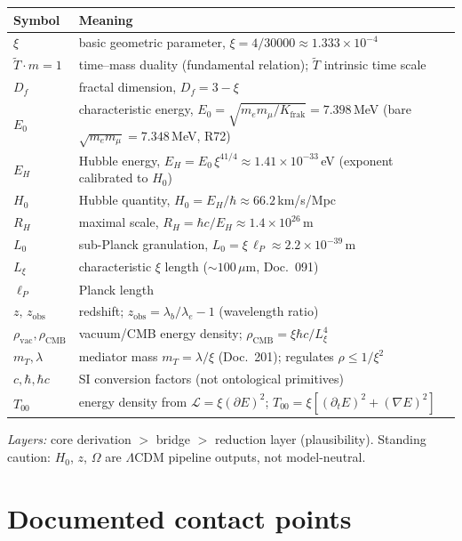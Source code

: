 \noindent
\begin{tabular}{@{}ll@{}}
\toprule
Symbol & Meaning \\
\midrule
$\xi$ & basic geometric parameter, $\xi = 4/30000 \approx 1.333\times10^{-4}$ \\
$\tilde T\cdot m=1$ & time--mass duality (fundamental relation); $\tilde T$ intrinsic time scale \\
$D_f$ & fractal dimension, $D_f = 3-\xi$ \\
$E_0$ & characteristic energy, $E_0=\sqrt{m_e m_\mu/K_{\text{frak}}}=7.398$\,MeV (bare $\sqrt{m_e m_\mu}=7.348$\,MeV, R72) \\
$E_H$ & Hubble energy, $E_H = E_0\,\xi^{41/4} \approx 1.41\times10^{-33}$\,eV (exponent calibrated to $H_0$) \\
$H_0$ & Hubble quantity, $H_0 = E_H/\hbar \approx 66.2$\,km/s/Mpc \\
$R_H$ & maximal scale, $R_H = \hbar c/E_H \approx 1.4\times10^{26}$\,m \\
$L_0$ & sub-Planck granulation, $L_0 = \xi\,\ell_P \approx 2.2\times10^{-39}$\,m \\
$L_\xi$ & characteristic $\xi$ length ($\sim 100\,\mu$m, Doc.~091) \\
$\ell_P$ & Planck length \\
$z,\,z_{\text{obs}}$ & redshift; $z_{\text{obs}}=\lambda_b/\lambda_e-1$ (wavelength ratio) \\
$\rho_{\text{vac}},\rho_{\text{CMB}}$ & vacuum/CMB energy density; $\rho_{\text{CMB}}=\xi\hbar c/L_\xi^4$ \\
$m_T,\lambda$ & mediator mass $m_T=\lambda/\xi$ (Doc.~201); regulates $\rho\le 1/\xi^2$ \\
$c,\hbar,\hbar c$ & SI conversion factors (not ontological primitives) \\
$T_{00}$ & energy density from $\mathcal{L}=\xi(\partial E)^2$; $T_{00}=\xi[(\partial_t E)^2+(\nabla E)^2]$ \\
\bottomrule
\end{tabular}

\medskip
\noindent\emph{Layers:} core derivation $>$ bridge $>$ reduction layer
(plausibility). Standing caution: $H_0$, $z$, $\Omega$ are $\Lambda$CDM
pipeline outputs, not model-neutral.

\section{Documented contact points}
\label{sec:263-doc}


